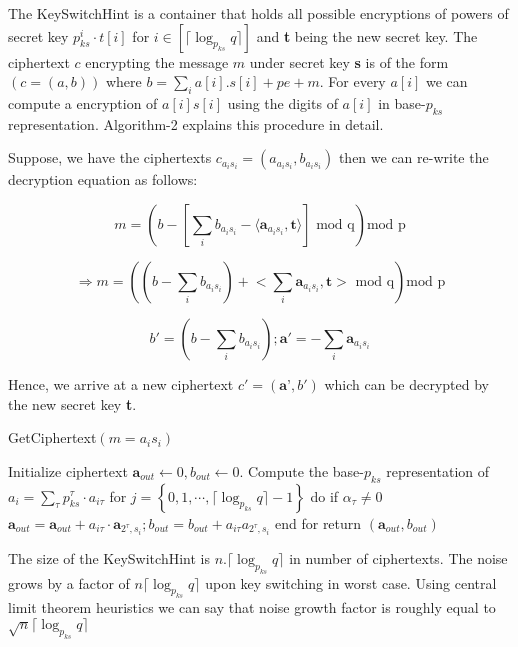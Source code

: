 \documentclass[10pt,journal,compsoc]{IEEEtran}
\theoremstyle{definition}
\begin{document}
The KeySwitchHint is a container that holds all possible encryptions of powers of secret key $p_{ks}^i\cdot t[i]$ for $i \in \left[\lceil \log_{p_{ks}} q \rceil \right]$ and \textbf{t} being the new secret key. The ciphertext $c$ encrypting the message $m$ under secret key \textbf{s} is of the form $\left( c = (a,b)\right)$ where $b = \sum_i a[i].s[i] + pe +m$. For every $a[i]$ we can compute a encryption of $a[i]s[i]$ using the digits of $a[i]$ in base-$p_{ks}$ representation. Algorithm-2 explains this procedure in detail. 

Suppose, we have the ciphertexts $c_{a_is_i} = \left( a_{a_is_i},b_{a_is_i}\right)$ then we can re-write the decryption equation as follows:

$$ m = \left(b - \left[\sum_i b_{a_is_i}-\langle \textbf{a}_{a_is_i},\textbf{t}\rangle\right] \textrm{ mod q}\right)\textrm{mod p}$$

$$\Rightarrow m = \left(\left(b - \sum_i b_{a_is_i}\right) + \biggl< \sum_i \textbf{a}_{a_is_i},\textbf{t} \biggr> \textrm{ mod q}\right)\textrm{mod p}$$

$$b' = \left(b - \sum_i b_{a_is_i}\right); \textbf{a}' = -\sum_i \textbf{a}_{a_is_i}$$

Hence, we arrive at a new ciphertext $c' = \left(\textbf{a'},b'\right)$ which can be decrypted by the new secret key \textbf{t}.

\begin{algorithm}
\caption{GetCiphertext$\left( m = a_is_i\right)$}
\begin{algorithmic}[1]
\State Initialize ciphertext $\textbf{a}_{out}\leftarrow 0,b_{out}\leftarrow 0$.
\State Compute the base-$p_{ks}$ representation of $a_i = \sum_{\tau} p_{ks}^{\tau}\cdot a_{i\tau}$
\State for $j = \left\{ 0,1,\cdots,\lceil \log_{p_{ks}} q\rceil -1 \right\}$ do
\State \quad if $\alpha_\tau \neq 0$
\State \quad \quad $\textbf{a}_{out} = \textbf{a}_{out} + a_{i\tau}\cdot\textbf{a}_{2^{\tau},s_i}; b_{out} = b_{out} + a_{i\tau}a_{2^\tau,s_i}$
\State end for
\State return $\left(\textbf{a}_{out},b_{out}\right)$

\EndProcedure
\end{algorithmic}
\end{algorithm}

The size of the KeySwitchHint is $n.\lceil \log_{p_{ks}} q\rceil$ in number of ciphertexts. The noise grows by a factor of $n\lceil \log_{p_{ks}} q\rceil$ upon key switching in worst case. Using central limit theorem heuristics we can say that noise growth factor is roughly equal to $\sqrt{n}\lceil \log_{p_{ks}} q\rceil$
\end{document}
